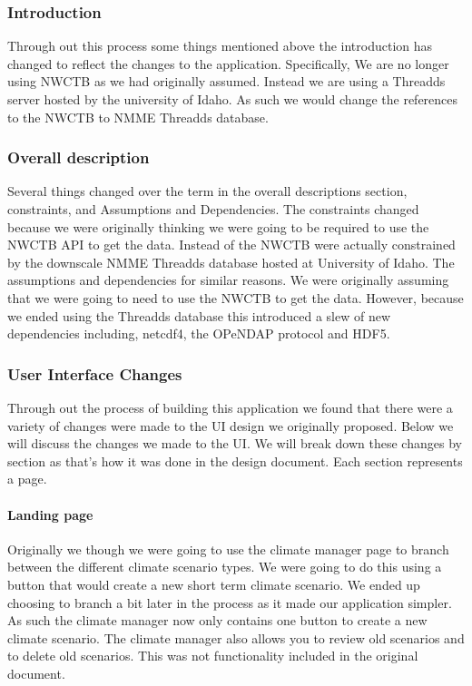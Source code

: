 \documentclass[onecolumn, draftclsnofoot,10pt, compsoc]{article}
\begin{document}
        \subsubsection{Introduction}
	    Through out this process some things mentioned above the introduction has changed to reflect the changes to the application. Specifically, We are no longer using NWCTB as we had originally assumed. Instead we are using a Threadds server hosted by the university of Idaho. As such we would change the references to the NWCTB to NMME Threadds database.\\

	    \subsubsection{Overall description}
	    Several things changed over the term in the overall descriptions section, constraints, and Assumptions and Dependencies. The constraints changed because we were originally thinking we were going to be required to use the NWCTB API to get the data. Instead of the NWCTB were actually constrained by the downscale NMME Threadds database hosted at University of Idaho. The assumptions and dependencies for similar reasons. We were originally assuming that we were going to need to use the NWCTB to get the data. However, because we ended using the Threadds database this introduced a slew of new dependencies including, netcdf4, the OPeNDAP protocol and HDF5.\\

	    \subsubsection{User Interface Changes}
	    Through out the process of building this application we found that there were a variety of changes were made to the UI design we originally proposed. Below we will discuss the changes we made to the UI. We will break down these changes by section as that's how it was done in the design document. Each section represents a page.\\

	        \paragraph{Landing page}
	         Originally we though we were going to use the climate manager page to branch between the different climate scenario types. We were going to do this using a button that would create a new short term climate scenario. We ended up choosing to branch a bit later in the process as it made our application simpler. As such the climate manager now only contains one button to create a new climate scenario. The climate manager also allows you to review old scenarios and to delete old scenarios. This was not functionality included in the original document.\\
\end{document}

